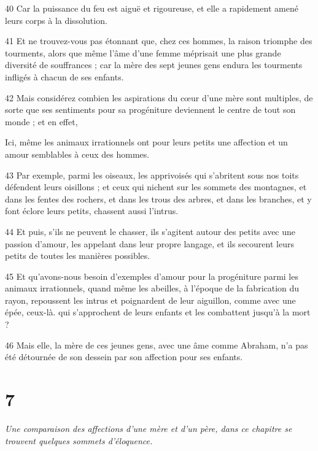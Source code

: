 \par 40 Car la puissance du feu est aiguë et rigoureuse, et elle a rapidement amené leurs corps à la dissolution.

\par 41 Et ne trouvez-vous pas étonnant que, chez ces hommes, la raison triomphe des tourments, alors que même l'âme d'une femme méprisait une plus grande diversité de souffrances ; car la mère des sept jeunes gens endura les tourments infligés à chacun de ses enfants.

\par 42 Mais considérez combien les aspirations du cœur d'une mère sont multiples, de sorte que ses sentiments pour sa progéniture deviennent le centre de tout son monde ; et en effet, \p

\par Ici, même les animaux irrationnels ont pour leurs petits une affection et un amour semblables à ceux des hommes.

\par 43 Par exemple, parmi les oiseaux, les apprivoisés qui s'abritent sous nos toits défendent leurs oisillons ; et ceux qui nichent sur les sommets des montagnes, et dans les fentes des rochers, et dans les trous des arbres, et dans les branches, et y font éclore leurs petits, chassent aussi l'intrus.

\par 44 Et puis, s'ils ne peuvent le chasser, ils s'agitent autour des petits avec une passion d'amour, les appelant dans leur propre langage, et ils secourent leurs petits de toutes les manières possibles.

\par 45 Et qu'avons-nous besoin d'exemples d'amour pour la progéniture parmi les animaux irrationnels, quand même les abeilles, à l'époque de la fabrication du rayon, repoussent les intrus et poignardent de leur aiguillon, comme avec une épée, ceux-là. qui s'approchent de leurs enfants et les combattent jusqu'à la mort ?

\par 46 Mais elle, la mère de ces jeunes gens, avec une âme comme Abraham, n'a pas été détournée de son dessein par son affection pour ses enfants.

\chapter{7}

\par \textit{Une comparaison des affections d'une mère et d'un père, dans ce chapitre se trouvent quelques sommets d'éloquence.}

